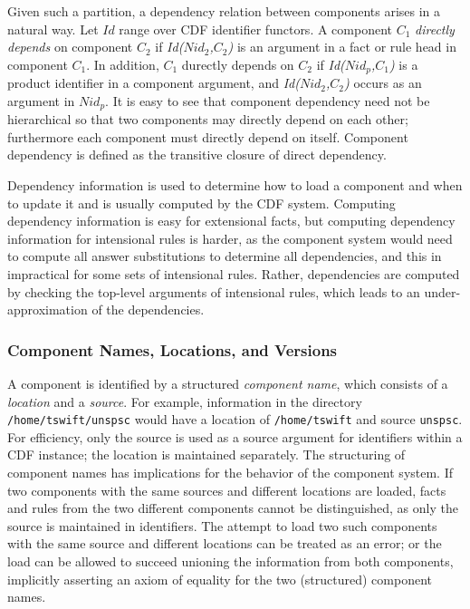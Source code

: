 Given such a partition, a dependency relation between components
arises in a natural way.  Let $Id$ range over CDF identifier functors.
A component $C_1$ {\em directly depends} on component $C_2$ if {\em
Id($Nid_2$,$C_2$)} is an argument in a fact or rule head in component
$C_1$.  In addition, $C_1$ durectly depends on $C_2$ if {\em
Id($Nid_p$,$C_1$)} is a product identifier in a component argument,
and {\em Id($Nid_2$,$C_2$)} occurs as an argument in $Nid_p$.  It is
easy to see that component dependency need not be hierarchical so that
two components may directly depend on each other; furthermore each
component must directly depend on itself.  Component dependency is
defined as the transitive closure of direct dependency.

Dependency information is used to determine how to load a component
and when to update it and is usually computed by the CDF system.
Computing dependency information is easy for extensional facts, but
computing dependency information for intensional rules is harder, as
the component system would need to compute all answer substitutions to
determine all dependencies, and this in impractical for some sets of
intensional rules.  Rather, dependencies are computed by checking the
top-level arguments of intensional rules, which leads to an
under-approximation of the dependencies.

\subsubsection{Component Names, Locations, and Versions}

A component is identified by a structured {\em component name}, which
consists of a {\em location} and a {\em source}.  For example,
information in the directory {\tt /home/tswift/unspsc} would have a
location of {\tt /home/tswift} and source {\tt unspsc}.  For
efficiency, only the source is used as a source argument for
identifiers within a CDF instance; the location is maintained
separately.  The structuring of component names has implications for
the behavior of the component system.  If two components with the same
sources and different locations are loaded, facts and rules from the
two different components cannot be distinguished, as only the source
is maintained in identifiers.  The attempt to load two such components
with the same source and different locations can be treated as an
error; or the load can be allowed to succeed unioning the information
from both components, implicitly asserting an axiom of equality for
the two (structured) component names.

